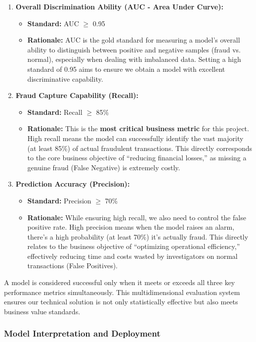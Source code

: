 \documentclass[sigplan,screen]{acmart}
\begin{document}
\begin{enumerate}
\item \textbf{Overall Discrimination Ability (AUC - Area Under Curve):}
\begin{itemize}
    \item \textbf{Standard:} AUC $\geq$ 0.95
    \item \textbf{Rationale:} AUC is the gold standard for measuring a model's overall ability to distinguish between positive and negative samples (fraud vs. normal), especially when dealing with imbalanced data. Setting a high standard of 0.95 aims to ensure we obtain a model with excellent discriminative capability.
\end{itemize}
\item \textbf{Fraud Capture Capability (Recall):}
    \begin{itemize}
    \item \textbf{Standard:} Recall $\geq$ 85\%
    \item \textbf{Rationale:} This is the \textbf{most critical business metric} for this project. High recall means the model can successfully identify the vast majority (at least 85\%) of actual fraudulent transactions. This directly corresponds to the core business objective of ``reducing financial losses,'' as missing a genuine fraud (False Negative) is extremely costly.
    \end{itemize}
\item \textbf{Prediction Accuracy (Precision):}
\begin{itemize}
    \item \textbf{Standard:} Precision $\geq$ 70\%
    \item \textbf{Rationale:} While ensuring high recall, we also need to control the false positive rate. High precision means when the model raises an alarm, there's a high probability (at least 70\%) it's actually fraud. This directly relates to the business objective of ``optimizing operational efficiency,'' effectively reducing time and costs wasted by investigators on normal transactions (False Positives).
\end{itemize}
\end{enumerate}
    
A model is considered successful only when it meets or exceeds all three key performance metrics simultaneously. This multidimensional evaluation system ensures our technical solution is not only statistically effective but also meets business value standards.
    
\subsubsection{Model Interpretation and Deployment}
    
\end{document}
